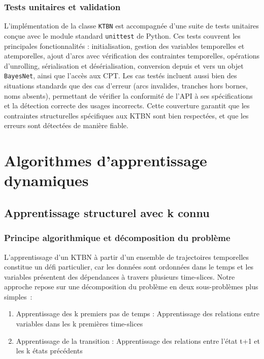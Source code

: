 \documentclass{article}
\begin{document}
\subsubsection{Tests unitaires et validation}

L'implémentation de la classe \texttt{KTBN} est accompagnée d'une suite de tests unitaires conçue avec le
module standard \texttt{unittest} de Python. Ces tests couvrent les principales fonctionnalités :
initialisation, gestion des variables temporelles et atemporelles, ajout d'arcs avec vérification des contraintes
temporelles, opérations d'unrolling, sérialisation et désérialisation, conversion depuis et vers un objet
\texttt{BayesNet}, ainsi que l'accès aux CPT. Les cas testés incluent aussi bien des situations standards
que des cas d'erreur (arcs invalides, tranches hors bornes, noms absents), permettant de vérifier la conformité
de l'API à ses spécifications et la détection correcte des usages incorrects. Cette couverture garantit que
les contraintes structurelles spécifiques aux KTBN sont bien respectées, et que les erreurs sont détectées de
manière fiable.


\section{Algorithmes d'apprentissage dynamiques}

\subsection{Apprentissage structurel avec k connu}

\subsubsection{Principe algorithmique et décomposition du problème}

L'apprentissage d'un KTBN à partir d'un ensemble de trajectoires temporelles constitue un défi particulier,
car les données sont ordonnées dans le temps et les variables présentent des dépendances à travers plusieurs
time-slices. Notre approche repose sur une décomposition du problème en deux sous-problèmes plus simples~:

\begin{enumerate}
    \item Apprentissage des k premiers pas de temps : Apprentissage des relations entre variables dans les
          k premières time-slices
    \item Apprentissage de la transition : Apprentissage des relations entre l'état t+1 et les k états précédents
\end{enumerate}
\end{document}
